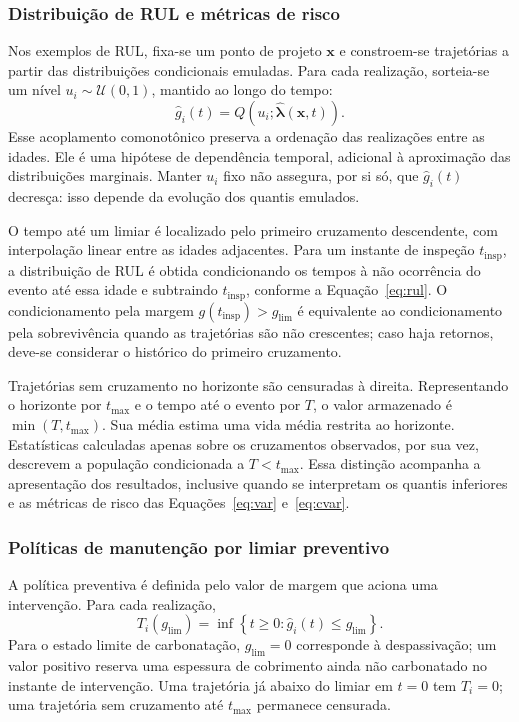 \subsubsection{Distribui\c{c}\~ao de RUL e m\'etricas de risco}
\label{subsec:ttf_rul}

Nos exemplos de RUL, fixa-se um ponto de projeto $\mathbf{x}$ e constroem-se trajetórias a partir das distribuições condicionais emuladas. Para cada realização, sorteia-se um nível $u_i\sim\mathcal{U}(0,1)$, mantido ao longo do tempo:
\begin{equation}
    \hat{g}_i(t)=Q\!\left(u_i;\hat{\boldsymbol{\lambda}}(\mathbf{x},t)\right).
    \label{eq:trajetoria_quantilica}
\end{equation}
Esse acoplamento comonotônico preserva a ordenação das realizações entre as idades. Ele é uma hipótese de dependência temporal, adicional à aproximação das distribuições marginais. Manter $u_i$ fixo não assegura, por si só, que $\hat{g}_i(t)$ decresça: isso depende da evolução dos quantis emulados.

O tempo até um limiar é localizado pelo primeiro cruzamento descendente, com interpolação linear entre as idades adjacentes. Para um instante de inspeção $t_{\mathrm{insp}}$, a distribuição de RUL é obtida condicionando os tempos à não ocorrência do evento até essa idade e subtraindo $t_{\mathrm{insp}}$, conforme a Equação~\eqref{eq:rul}. O condicionamento pela margem $g(t_{\mathrm{insp}})>g_{\mathrm{lim}}$ é equivalente ao condicionamento pela sobrevivência quando as trajetórias são não crescentes; caso haja retornos, deve-se considerar o histórico do primeiro cruzamento.

Trajetórias sem cruzamento no horizonte são censuradas à direita. Representando o horizonte por $t_{\max}$ e o tempo até o evento por $T$, o valor armazenado é $\min(T,t_{\max})$. Sua média estima uma vida média restrita ao horizonte. Estatísticas calculadas apenas sobre os cruzamentos observados, por sua vez, descrevem a população condicionada a $T<t_{\max}$. Essa distinção acompanha a apresentação dos resultados, inclusive quando se interpretam os quantis inferiores e as métricas de risco das Equações~\eqref{eq:var} e~\eqref{eq:cvar}.

\subsubsection{Políticas de manutenção por limiar preventivo}
\label{subsec:manutencao}

A política preventiva é definida pelo valor de margem que aciona uma intervenção. Para cada realização,
\begin{equation}
    T_i(g_{\mathrm{lim}})=\inf\left\{t\geq0:\hat{g}_i(t)\leq g_{\mathrm{lim}}\right\}.
    \label{eq:tempo_limiar_manutencao}
\end{equation}
Para o estado limite de carbonatação, $g_{\mathrm{lim}}=0$ corresponde à despassivação; um valor positivo reserva uma espessura de cobrimento ainda não carbonatado no instante de intervenção. Uma trajetória já abaixo do limiar em $t=0$ tem $T_i=0$; uma trajetória sem cruzamento até $t_{\max}$ permanece censurada.

